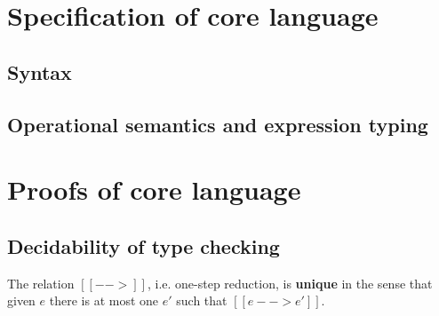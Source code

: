 \section{Specification of core language}

\subsection{Syntax}
\gram{\otte\ottinterrule
        \otts\ottinterrule
        \ottG\ottinterrule
        \ottv}

\subsection{Operational semantics and expression typing}
\ottdefnstep{}
\ottusedrule{\ottdruleSXXMu{}}
\ottdefnexpr{}
\ottusedrule{\ottdruleTXXMu{}}

\section{Proofs of core language}
\subsection{Decidability of type checking}
\begin{lem}
	The relation $[[-->]]$, i.e. one-step reduction, is \textbf{unique} in the sense that given $e$ there is at most one $e'$ such that $[[e --> e']]$.
\end{lem}


